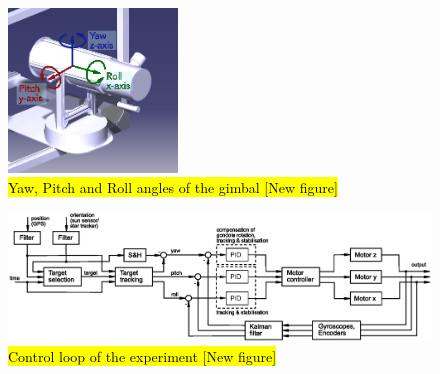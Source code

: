 \begin{figure}%
	\centering
	\includegraphics[width = 0.4\textwidth]{4-experiment-design/img/software/Yaw_Pitch_Roll.eps}
	\caption{\hl{Yaw, Pitch and Roll angles of the gimbal [New figure]}}
	\label{fig::software::Yaw_Pitch_Roll}
\end{figure}

\newpage
\begin{landscape}
	\begin{figure}
		\includegraphics[width=\linewidth]{4-experiment-design/img/software/Control_loop.eps}
		\caption{\hl{Control loop of the experiment [New figure]}}
		\label{fig::software::control_loop}
	\end{figure}
\end{landscape}


\raggedbottom
